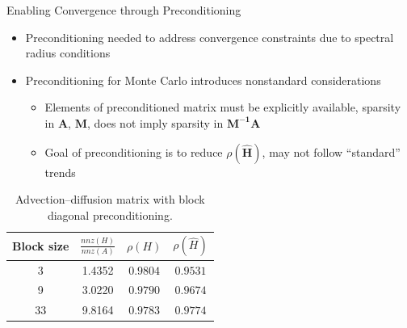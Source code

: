 \documentclass{beamer}
\begin{document}
\begin{frame}{Enabling Convergence through Preconditioning}
  \begin{itemize}
    \item Preconditioning needed to address convergence constraints due to
      spectral radius conditions
    \item Preconditioning for Monte Carlo introduces nonstandard considerations
      \begin{itemize}
      \item Elements of preconditioned matrix must be explicitly available,
        sparsity in $\mathbf{A}$, $\mathbf{M}$, does not imply sparsity in
        $\mathbf{M^{-1}A}$
        \item Goal of preconditioning is to reduce $\rho(\hat{\mathbf{H}})$,
          may not follow ``standard'' trends
      \end{itemize}
  \end{itemize}
  \vfill

  \begin{table}
  \centering
  \caption{Advection--diffusion matrix with block diagonal preconditioning.}
  \begin{tabular}{cccc}
  \toprule
  \textbf{Block size} & \textbf{$\frac{nnz(H)}{nnz(A)}$}& $\rho(H)$
  &$\rho(\hat{H})$\\
  \midrule
   3 & 1.4352 & $0.9804$ & $0.9531$\\
   9 & 3.0220 & $0.9790$ & $0.9674$\\
   33 & 9.8164 & $0.9783$  & $0.9774$\\
  \bottomrule
  \end{tabular}
  \end{table}
\end{frame}

\end{document}
